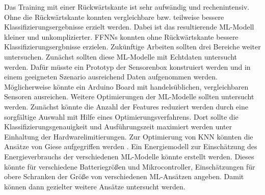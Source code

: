 \newline
Das Training mit einer Rückwärtskante ist sehr aufwändig und rechenintensiv.
Ohne die Rückwärtskante konnten vergleichbare bzw. teilweise bessere Klassifizierungsergebnisse erzielt werden.
Dabei ist das resultierende ML-Modell kleiner und unkomplizierter.
FFNNs konnten ohne Rückwärtskante bessere Klassifizierungsergbnisse erzielen.
\newline
\newline
Zukünftige Arbeiten sollten drei Bereiche weiter untersuchen.
Zunächst sollten diese ML-Modelle mit Echtdaten untersucht werden.
Dafür müsste ein Prototyp der Sensorenbox konstruiert werden und in
einem geeigneten Szenario ausreichend Daten aufgenommen werden.
Möglicherweise könnte ein Arduino Board mit handelsüblichen, vergleichbaren Sensoren ausreichen.
\newline
\newline
Weitere Optimierungen der ML-Modelle sollten untersucht werden.
Zunächst könnte die Anzahl der Features reduziert werden durch eine sorgfältige Auswahl mit Hilfe eines Optimierungsverfahrens.
Dort sollte die Klassifizierungsgenauigkeit und Ausführungszeit maximiert werden unter Einhaltung der Hardwarelimitierungen.
Zur Optimierung von KNN könnten die Ansätze von Giese aufgegriffen werden \cite{gieseThesis}.
\newline
\newline
Ein Energiemodell zur Einschätzung des Energieverbrauchs der verschiedenen ML-Modelle könnte erstellt werden.
Dieses könnte für verschiedene Batteriegrößen und Mikrocontroller, Einschätzungen für obere Schranken der Größe von
verschiedenen ML-Ansätzen angeben.
Damit können dann gezielter weitere Ansätze untersucht werden.